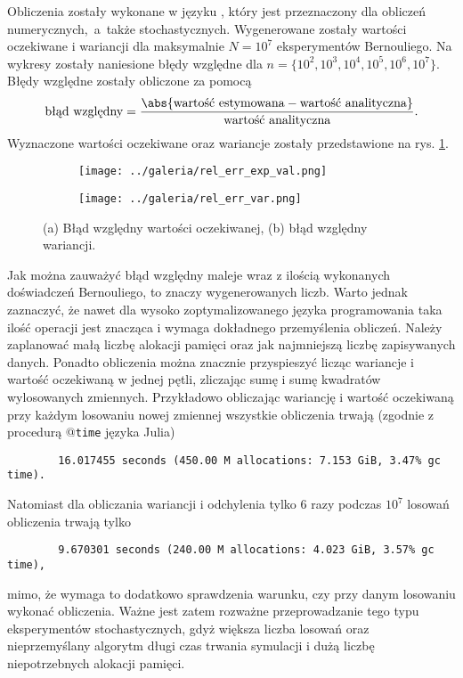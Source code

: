 \documentclass[a4paper,12pt]{article}
\begin{document}
    Obliczenia zostały wykonane w języku \julia, który jest przeznaczony dla obliczeń numerycznych,~a~także stochastycznych.
    Wygenerowane zostały wartości oczekiwane i wariancji dla maksymalnie $N= 10^7$ eksperymentów Bernouliego.
    Na wykresy zostały naniesione błędy względne dla $n = \{10^2, 10^3, 10^4, 10^5, 10^6, 10^7\}$.
    Błędy względne zostały obliczone za pomocą 
    \[ \text{błąd względny} = \frac{\abs{\text{wartość estymowana} - \text{wartość analityczna}}}{\text{wartość analityczna}}. \]
    Wyznaczone wartości oczekiwane oraz wariancje zostały przedstawione na rys. \ref{fig:rys}.
    \begin{figure}[h]
        \centering
        \begin{subfigure}{0.49\textwidth}
            \texttt{[image: ../galeria/rel\_err\_exp\_val.png]}
            \caption{}
        \end{subfigure}
        \begin{subfigure}{0.49\textwidth}
            \texttt{[image: ../galeria/rel\_err\_var.png]}
            \caption{}
        \end{subfigure}
        \caption{(a) Błąd względny wartości oczekiwanej, (b) błąd względny wariancji.}
        \label{fig:rys}
    \end{figure}
    Jak można zauważyć błąd względny maleje wraz z ilością wykonanych doświadczeń Bernouliego, to znaczy wygenerowanych liczb. 
    Warto jednak zaznaczyć, że nawet dla wysoko zoptymalizowanego języka programowania taka ilość operacji jest znacząca i wymaga dokładnego przemyślenia obliczeń.
    Należy zaplanować małą liczbę alokacji pamięci oraz jak najmniejszą liczbę zapisywanych danych.
    Ponadto obliczenia można znacznie przyspieszyć licząc wariancje i wartość oczekiwaną w jednej pętli, zliczając sumę i sumę kwadratów wylosowanych zmiennych.
    Przykładowo obliczając wariancję i wartość oczekiwaną przy każdym losowaniu nowej zmiennej wszystkie obliczenia trwają (zgodnie z procedurą @\texttt{time} języka Julia)
    \begin{verbatim}
        16.017455 seconds (450.00 M allocations: 7.153 GiB, 3.47% gc time).
    \end{verbatim}
    Natomiast dla obliczania wariancji i odchylenia tylko 6 razy podczas $10^7$ losowań obliczenia trwają tylko
    \begin{verbatim}
        9.670301 seconds (240.00 M allocations: 4.023 GiB, 3.57% gc time),
    \end{verbatim}
    mimo, że wymaga to dodatkowo sprawdzenia warunku, czy przy danym losowaniu wykonać obliczenia. 
    Ważne jest zatem rozważne przeprowadzanie tego typu eksperymentów stochastycznych, gdyż większa liczba losowań oraz nieprzemyślany algorytm długi czas trwania symulacji i dużą liczbę niepotrzebnych alokacji pamięci.
\end{document}
